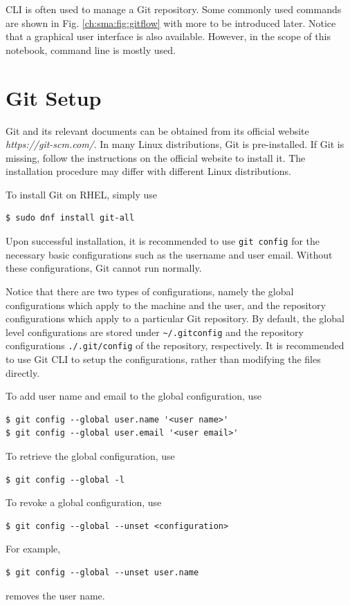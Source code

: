 CLI is often used to manage a Git repository. Some commonly used commands are shown in Fig. \ref{ch:sma:fig:gitflow} with more to be introduced later. Notice that a graphical user interface is also available. However, in the scope of this notebook, command line is mostly used.

\section{Git Setup}

Git and its relevant documents can be obtained from its official website \textit{https://git-scm.com/}. In many Linux distributions, Git is pre-installed. If Git is missing, follow the instructions on the official website to install it. The installation procedure may differ with different Linux distributions.

To install Git on RHEL, simply use
\begin{lstlisting}
$ sudo dnf install git-all
\end{lstlisting}

Upon successful installation, it is recommended to use \verb|git config| for the necessary basic configurations such as the username and user email. Without these configurations, Git cannot run normally.

Notice that there are two types of configurations, namely the global configurations which apply to the machine and the user, and the repository configurations which apply to a particular Git repository. By default, the global level configurations are stored under \verb|~/.gitconfig| and the repository configurations \verb|./.git/config| of the repository, respectively. It is recommended to use Git CLI to setup the configurations, rather than modifying the files directly.

To add user name and email to the global configuration, use
\begin{lstlisting}
$ git config --global user.name '<user name>'
$ git config --global user.email '<user email>'
\end{lstlisting}
To retrieve the global configuration, use
\begin{lstlisting}
$ git config --global -l
\end{lstlisting}
To revoke a global configuration, use
\begin{lstlisting}
$ git config --global --unset <configuration>
\end{lstlisting}
For example,
\begin{lstlisting}
$ git config --global --unset user.name
\end{lstlisting}
removes the user name.

